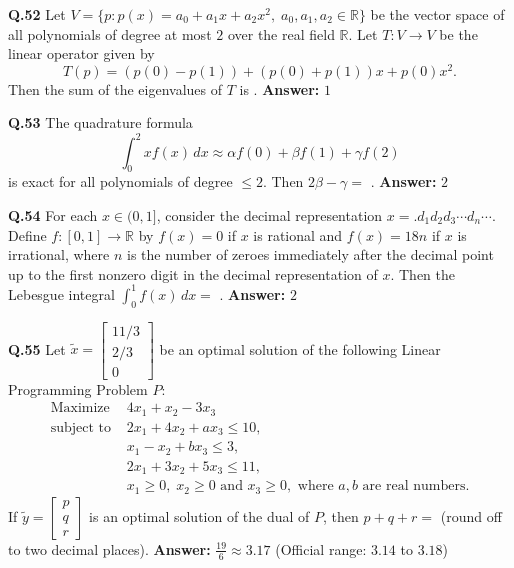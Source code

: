 \documentclass[11pt,a4paper]{article}
\newcommand{\ans}[1]{\textbf{Answer:} #1\par\medskip}
\begin{document}
\textbf{Q.52} Let $V = \{p : p(x) = a_0 + a_1 x + a_2 x^2,\; a_0, a_1, a_2 \in \mathbb{R}\}$ be the vector space of all polynomials of degree at most $2$ over the real field $\mathbb{R}$. Let $T : V \to V$ be the linear operator given by
\[
  T(p) = (p(0) - p(1)) + (p(0) + p(1))x + p(0)x^2.
\]
Then the sum of the eigenvalues of $T$ is \underline{\hspace{2cm}}.
\ans{$1$}

\textbf{Q.53} The quadrature formula
\[
  \int_0^2 x f(x)\,dx \approx \alpha f(0) + \beta f(1) + \gamma f(2)
\]
is exact for all polynomials of degree $\le 2$. Then $2\beta - \gamma =$ \underline{\hspace{2cm}}.
\ans{$2$}

\textbf{Q.54} For each $x \in (0, 1]$, consider the decimal representation $x = .d_1 d_2 d_3 \cdots d_n \cdots$. Define $f : [0, 1] \to \mathbb{R}$ by $f(x) = 0$ if $x$ is rational and $f(x) = 18n$ if $x$ is irrational, where $n$ is the number of zeroes immediately after the decimal point up to the first nonzero digit in the decimal representation of $x$. Then the Lebesgue integral $\displaystyle\int_0^1 f(x)\,dx =$ \underline{\hspace{2cm}}.
\ans{$2$}

\textbf{Q.55} Let $\tilde{x} = \begin{bmatrix} 11/3 \\ 2/3 \\ 0 \end{bmatrix}$ be an optimal solution of the following Linear Programming Problem $P$:
\begin{align*}
  \text{Maximize } & 4x_1 + x_2 - 3x_3 \\
  \text{subject to } & 2x_1 + 4x_2 + a x_3 \le 10, \\
                     & x_1 - x_2 + b x_3 \le 3, \\
                     & 2x_1 + 3x_2 + 5x_3 \le 11, \\
                     & x_1 \ge 0,\; x_2 \ge 0 \text{ and } x_3 \ge 0, \text{ where } a, b \text{ are real numbers.}
\end{align*}
If $\tilde{y} = \begin{bmatrix} p \\ q \\ r \end{bmatrix}$ is an optimal solution of the dual of $P$, then $p + q + r =$ \underline{\hspace{2cm}} (round off to two decimal places).
\ans{$\frac{19}{6} \approx 3.17$ (Official range: $3.14$ to $3.18$)}
\end{document}
